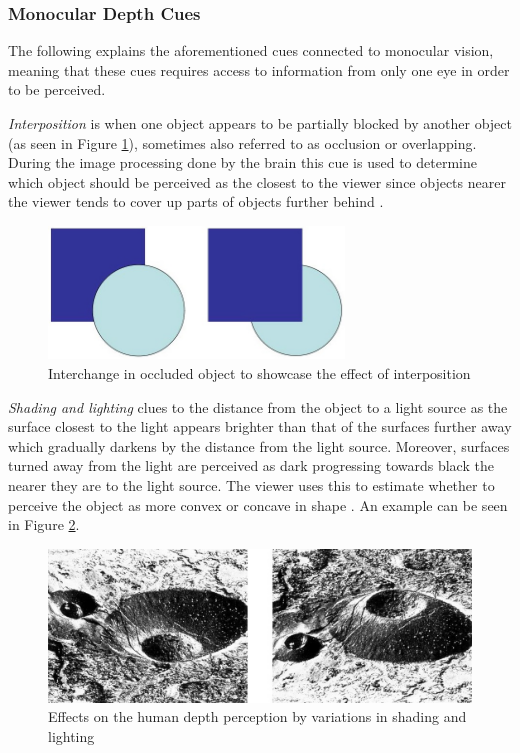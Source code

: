 \subsubsection{Monocular Depth Cues}
The following explains the aforementioned cues connected to monocular vision, meaning that these cues requires access to information from only one eye in order to be perceived.

\textit{Interposition} is when one object appears to be partially blocked by another object (as seen in Figure \ref{fig:cue0}), sometimes also referred to as occlusion or overlapping. During the image processing done by the brain this cue is used to determine which object should be perceived as the closest to the viewer since objects nearer the viewer tends to cover up parts of objects further behind \cite{Gale}.

\begin{figure}[h!]
   \centering
   \includegraphics[width=0.7\textwidth]{figures/cue0.jpg}
   \caption{Interchange in occluded object to showcase the effect of interposition \cite{Heeger}}\label{fig:cue0}
\end{figure}

\textit{Shading and lighting} clues to the distance from the object to a light source as the surface closest to the light appears brighter than that of the surfaces further away which gradually darkens by the distance from the light source. Moreover, surfaces turned away from the light are perceived as dark progressing towards black the nearer they are to the light source. The viewer uses this to estimate whether to perceive the object as more convex or concave in shape \cite{Gale}. An example can be seen in Figure \ref{fig:cue1}.\pagebreak

\begin{figure}[h!]
   \centering
   \includegraphics[width=\textwidth]{figures/cue1.jpg}
   \caption{Effects on the human depth perception by variations in shading and lighting \cite{Heeger}}\label{fig:cue1}
\end{figure}

